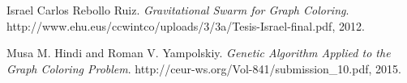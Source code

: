 \begin{thebibliography}{}

Israel Carlos Rebollo Ruiz. 
\textit{Gravitational Swarm for Graph Coloring}. 
http://www.ehu.eus/ccwintco/uploads/3/3a/Tesis-Israel-final.pdf, 2012.

Musa M. Hindi and Roman V. Yampolskiy. 
\textit{Genetic Algorithm Applied to the Graph Coloring Problem}. 
http://ceur-ws.org/Vol-841/submission\_10.pdf, 2015.

\end{thebibliography}